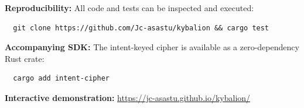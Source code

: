\documentclass[12pt,a4paper]{article}
\begin{document}
\medskip
\noindent\textbf{Reproducibility:} All code and tests can be inspected and executed:
\begin{verbatim}
  git clone https://github.com/Jc-asastu/kybalion && cargo test
\end{verbatim}

\noindent\textbf{Accompanying SDK:} The intent-keyed cipher is available as a zero-dependency Rust crate:
\begin{verbatim}
  cargo add intent-cipher
\end{verbatim}

\noindent\textbf{Interactive demonstration:} \url{https://jc-asastu.github.io/kybalion/}

\end{document}
